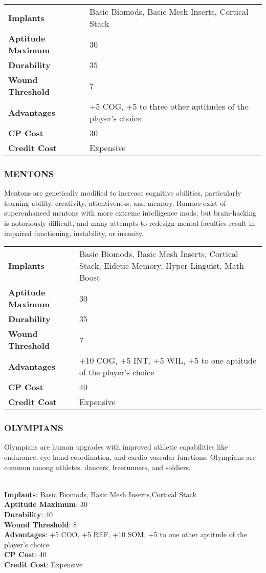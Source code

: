 \begin{tabular}{>{\bfseries}ll}
  Implants &  Basic Biomods, Basic Mesh Inserts, Cortical Stack\\
  Aptitude Maximum &  30 \\
  Durability &  35 \\
  Wound Threshold &  7 \\
  Advantages &  +5 COG, +5 to three other aptitudes of the player’s choice \\
  CP Cost &  30 \\
  Credit Cost &  Expensive
\end{tabular}

\subsubsection{MENTONS}
Mentons are genetically modified to increase cognitive abilities,
particularly learning ability, creativity, attentiveness, and memory. Rumors
exist of superenhanced mentons with more extreme intelligence mods, but
brain-hacking is notoriously difficult, and many attempts to redesign mental
faculties result in impaired functioning, instability, or insanity.

\begin{tabular}{>{\bfseries}ll}
  Implants &  Basic Biomods, Basic Mesh Inserts, Cortical Stack, Eidetic Memory, Hyper-Linguist, Math Boost \\
  Aptitude Maximum &  30 \\
  Durability &  35 \\
  Wound Threshold &  7 \\
  Advantages &  +10 COG, +5 INT, +5 WIL, +5 to one aptitude of the player’s choice \\
  CP Cost &  40 \\
  Credit Cost &  Expensive
\end{tabular}

\subsubsection{OLYMPIANS}
Olympians are human upgrades with improved athletic capabilities like
endurance, eye-hand coordination, and cardio-vascular functions. Olympians
are common among athletes, dancers, freerunners, and soldiers.

\\ \textbf{Implants}: Basic Biomods, Basic Mesh Inserts,Cortical Stack
\\ \textbf{Aptitude Maximum}: 30
\\ \textbf{Durability}: 40
\\ \textbf{Wound Threshold}: 8
\\ \textbf{Advantages}: +5 COO, +5 REF, +10 SOM, +5 to one other aptitude of the player’s choice
\\ \textbf{CP Cost}: 40
\\ \textbf{Credit Cost}: Expensive

